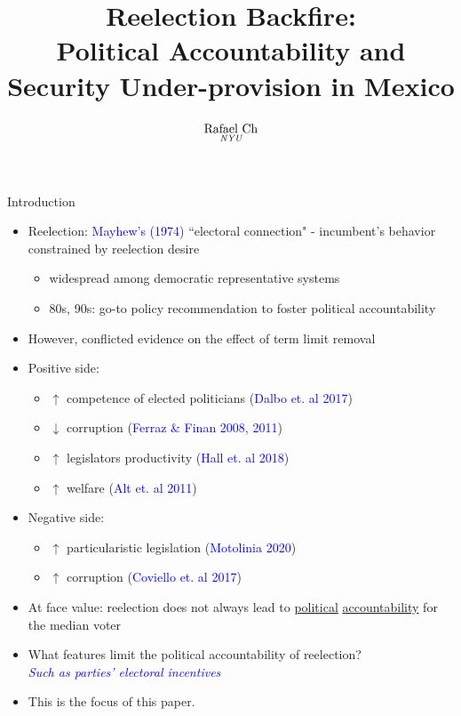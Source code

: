 \documentclass{beamer}
\title[Reelection Backfire]{Reelection Backfire: \\ Political Accountability and Security Under-provision in Mexico}
\author[rafael.ch@nyu.edu]{ $\underset{\text{\it NYU}}{\text{Rafael Ch}}$}
\date[]{}
\institute[]{}
\begin{document}
\frame{\titlepage}

\begin{frame}[label=introduction]{Introduction}

\begin{itemize}  
	 		  \setlength\itemsep{0.4em} 
\item Reelection: \textcolor{blue}{Mayhew's (1974)} ``electoral connection" - incumbent's behavior constrained by reelection desire
	\begin{itemize}
	\item  widespread among democratic representative systems 
	\item 80s, 90s: go-to policy recommendation to foster political accountability
	
	\end{itemize}
\item \alert{However,} conflicted evidence on the effect of term limit removal
\item Positive side:
	\begin{itemize}
	\item $\uparrow$ competence of elected politicians (\textcolor{blue}{Dalbo et. al 2017})
	\item $\downarrow$ corruption (\textcolor{blue}{Ferraz \& Finan 2008, 2011})
	\item $\uparrow$ legislators productivity (\textcolor{blue}{Hall et. al 2018})
	\item $\uparrow$ welfare (\textcolor{blue}{Alt et. al 2011})
	\end{itemize} 
\item Negative side:
	\begin{itemize}
	\item $\uparrow$ particularistic legislation (\textcolor{blue}{Motolinia 2020})
	\item $\uparrow$ corruption (\textcolor{blue}{Coviello et. al 2017}) %
	\end{itemize} 
\item At face value: reelection does not always lead to \underline{political} \underline{accountability} for the median voter 
\end{itemize}


\end{frame}
\begin{frame}[label=question] 
\begin{itemize}
	\item What features limit the political accountability of reelection?
	 \\[5pt]
\textit{\textcolor{blue}{Such as parties' electoral incentives}}
	\bigskip
\item
\alert{This is the focus of this paper.}
\end{itemize}
	
\end{frame}
\end{document}
